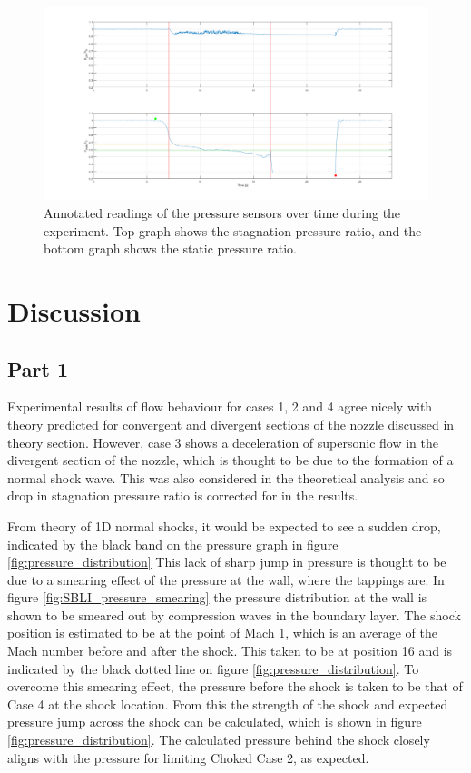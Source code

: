 \documentclass{article}
\begin{document}
\begin{figure}[H]
    \centering
    \includegraphics[width=1\textwidth]{../Supersonic_Nozzle/tunnel_pressures_annotated.png}
    \caption{Annotated readings of the pressure sensors over time during the experiment. Top graph shows the stagnation pressure ratio, and the bottom graph shows the static pressure ratio.}
    \label{fig:figure8}
\end{figure}

\section{Discussion}

\subsection{Part 1}

Experimental results of flow behaviour for cases 1, 2 and 4 agree nicely with theory predicted for convergent and divergent sections of the nozzle discussed in theory section.
However, case 3 shows a deceleration of supersonic flow in the divergent section of the nozzle, which is thought to be due to the formation of a normal shock wave.
This was also considered in the theoretical analysis and so drop in stagnation pressure ratio is corrected for in the results.

From theory of 1D normal shocks, it would be expected to see a sudden drop, indicated by the black band on the pressure graph in figure \ref{fig:pressure_distribution}
This lack of sharp jump in pressure is thought to be due to a smearing effect of the pressure at the wall, where the tappings are.
In figure \ref{fig:SBLI_pressure_smearing} the pressure distribution at the wall is shown to be smeared out by compression waves in the boundary layer.
The shock position is estimated to be at the point of Mach 1, which is an average of the Mach number before and after the shock.
This taken to be at position 16 and is indicated by the black dotted line on figure \ref{fig:pressure_distribution}.
To overcome this smearing effect, the pressure before the shock is taken to be that of Case 4 at the shock location.
From this the strength of the shock and expected pressure jump across the shock can be calculated, which is shown in figure \ref{fig:pressure_distribution}.
The calculated pressure behind the shock closely aligns with the pressure for limiting Choked Case 2, as expected.
\end{document}
